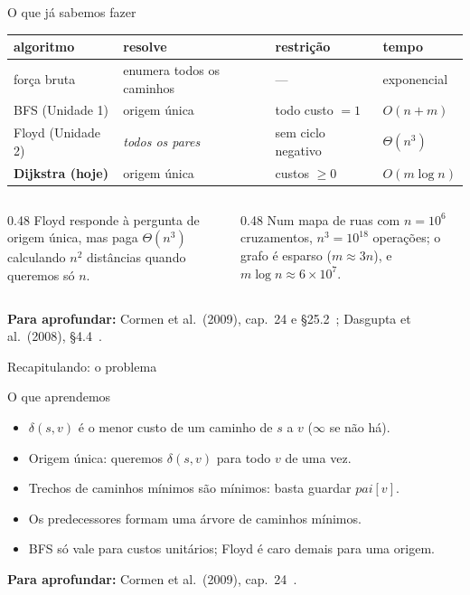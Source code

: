 \documentclass[aspectratio=169,xcolor=table]{beamer}
\newcommand{\fonte}[1]{%
  \vfill
  {\tiny\color{gray!55!black}\textbf{Para aprofundar:} #1\par}%
}
\begin{document}
\begin{frame}{O que já sabemos fazer}
  \begin{center}
  \scriptsize
  \begin{tabular}{llll}
    \toprule
    algoritmo & resolve & restrição & tempo \\
    \midrule
    força bruta & enumera todos os caminhos & --- & exponencial \\
    BFS (Unidade 1) & origem única & todo custo $= 1$ & $O(n + m)$ \\
    Floyd (Unidade 2) & \emph{todos os pares} & sem ciclo negativo & $\Theta(n^3)$ \\
    \textbf{Dijkstra (hoje)} & origem única & custos $\ge 0$ & $O(m \log n)$ \\
    \bottomrule
  \end{tabular}
  \end{center}
  \medskip
  \begin{columns}[T]
    \begin{column}{0.48\textwidth}
      \scriptsize
      Floyd responde à pergunta de origem única, mas paga $\Theta(n^3)$ calculando $n^2$
      distâncias quando queremos só $n$.
    \end{column}
    \begin{column}{0.48\textwidth}
      \scriptsize
      Num mapa de ruas com $n = 10^6$ cruzamentos, $n^3 = 10^{18}$ operações; o grafo é
      esparso ($m \approx 3n$), e $m \log n \approx 6 \times 10^7$.
    \end{column}
  \end{columns}
  \fonte{Cormen et al.\ (2009), cap.~24 e \S 25.2~\cite{cormen2009introduction};
    Dasgupta et al.\ (2008), \S 4.4~\cite{dasgupta2008algorithms}.}
\end{frame}

\begin{frame}{Recapitulando: o problema}
  \begin{block}{O que aprendemos}
    \begin{itemize}
      \item $\delta(s,v)$ é o menor custo de um caminho de $s$ a $v$ ($\infty$ se não há).
      \item Origem única: queremos $\delta(s,v)$ para todo $v$ de uma vez.
      \item Trechos de caminhos mínimos são mínimos: basta guardar $\mathit{pai}[v]$.
      \item Os predecessores formam uma árvore de caminhos mínimos.
      \item BFS só vale para custos unitários; Floyd é caro demais para uma origem.
    \end{itemize}
  \end{block}
  \fonte{Cormen et al.\ (2009), cap.~24~\cite{cormen2009introduction}.}
\end{frame}
\end{document}
